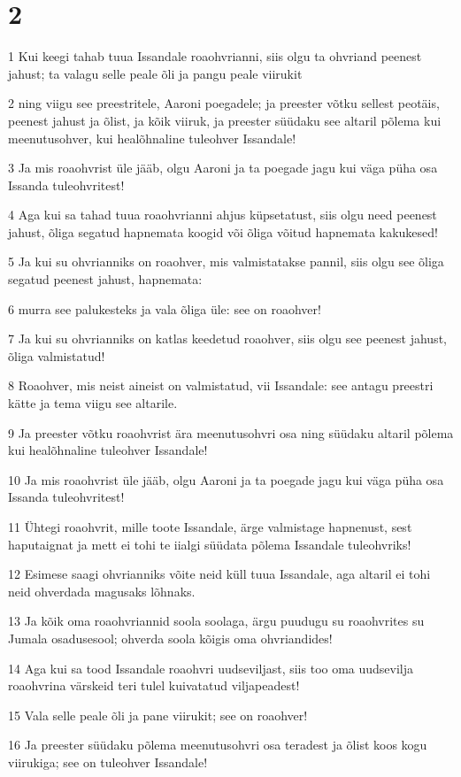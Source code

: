 \chapter{2}

\par 1 Kui keegi tahab tuua Issandale roaohvrianni, siis olgu ta ohvriand peenest jahust; ta valagu selle peale õli ja pangu peale viirukit
\par 2 ning viigu see preestritele, Aaroni poegadele; ja preester võtku sellest peotäis, peenest jahust ja õlist, ja kõik viiruk, ja preester süüdaku see altaril põlema kui meenutusohver, kui healõhnaline tuleohver Issandale!
\par 3 Ja mis roaohvrist üle jääb, olgu Aaroni ja ta poegade jagu kui väga püha osa Issanda tuleohvritest!
\par 4 Aga kui sa tahad tuua roaohvrianni ahjus küpsetatust, siis olgu need peenest jahust, õliga segatud hapnemata koogid või õliga võitud hapnemata kakukesed!
\par 5 Ja kui su ohvrianniks on roaohver, mis valmistatakse pannil, siis olgu see õliga segatud peenest jahust, hapnemata:
\par 6 murra see palukesteks ja vala õliga üle: see on roaohver!
\par 7 Ja kui su ohvrianniks on katlas keedetud roaohver, siis olgu see peenest jahust, õliga valmistatud!
\par 8 Roaohver, mis neist aineist on valmistatud, vii Issandale: see antagu preestri kätte ja tema viigu see altarile.
\par 9 Ja preester võtku roaohvrist ära meenutusohvri osa ning süüdaku altaril põlema kui healõhnaline tuleohver Issandale!
\par 10 Ja mis roaohvrist üle jääb, olgu Aaroni ja ta poegade jagu kui väga püha osa Issanda tuleohvritest!
\par 11 Ühtegi roaohvrit, mille toote Issandale, ärge valmistage hapnenust, sest haputaignat ja mett ei tohi te iialgi süüdata põlema Issandale tuleohvriks!
\par 12 Esimese saagi ohvrianniks võite neid küll tuua Issandale, aga altaril ei tohi neid ohverdada magusaks lõhnaks.
\par 13 Ja kõik oma roaohvriannid soola soolaga, ärgu puudugu su roaohvrites su Jumala osadusesool; ohverda soola kõigis oma ohvriandides!
\par 14 Aga kui sa tood Issandale roaohvri uudseviljast, siis too oma uudsevilja roaohvrina värskeid teri tulel kuivatatud viljapeadest!
\par 15 Vala selle peale õli ja pane viirukit; see on roaohver!
\par 16 Ja preester süüdaku põlema meenutusohvri osa teradest ja õlist koos kogu viirukiga; see on tuleohver Issandale!

